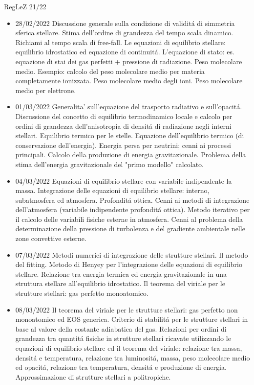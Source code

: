 \begin{frame}[allowframebreaks]{RegLeZ 21/22}
\begin{itemize}
\item 28/02/2022 Discussione generale sulla condizione di validit\'a di simmetria sferica stellare. Stima dell'ordine di grandezza del tempo scala dinamico. Richiami al tempo scala di free-fall. Le equazioni di equilibrio stellare: equilibrio idrostatico ed equazione di continuit\'a. L'equazione di stato: es. equazione di stai dei gas perfetti + pressione di radiazione. Peso molecolare medio. Esempio: calcolo del peso molecolare medio per materia completamente ionizzata. Peso molecolare medio degli ioni. Peso molecolare medio per elettrone.
\item 01/03/2022 Generalita' sull'equazione del trasporto radiativo e sull'opacit\'a. Discussione del concetto di equilibrio termodinamico locale e calcolo per ordini di grandezza dell'anisotropia di densit\'a di radiazione negli interni stellari. Equilibrio termico per le stelle. Equazione dell'equilibrio termico (di conservazione dell'energia). Energia persa per neutrini; cenni ai processi principali. Calcolo della produzione di energia gravitazionale. Problema della stima dell'energia gravitazionale del "primo modello" calcolato.
\item 04/03/2022 Equazioni di equilibrio stellare con variabile indipendente la massa. Integrazione delle equazioni di equilibrio stellare: interno, subatmosfera ed atmosfera. Profondit\'a ottica. Cenni ai metodi di integrazione dell'atmosfera (variabile indipendente profondit\'a ottica). Metodo iterativo per il calcolo delle variabili fisiche esterne in atmosfera. Cenni al problema della determinazione della pressione di turbolenza e del gradiente ambientale nelle zone convettive esterne.
\item 07/03/2022 Metodi numerici di integrazione delle strutture stellari. Il metodo del fitting. Metodo di Henyey per l'integrazione delle equazioni di equilibrio stellare. Relazione tra energia termica ed energia gravitazionale in una struttura stellare all'equilibrio idrostatico. Il teorema del viriale per le strutture stellari: gas perfetto monoatomico.
\item 08/03/2022 Il teorema del viriale per le strutture stellari: gas perfetto non monoatomico ed EOS generica. Criterio di stabilit\'a per le strutture stellari in base al valore della costante adiabatica del gas. Relazioni per ordini di grandezza tra quantit\'a fisiche in strutture stellari ricavate utilizzando le equazioni di equilibrio stellare ed il teorema del viriale: relazione tra massa, densit\'a e temperatura, relazione tra luminosit\'a, massa, peso molecolare medio ed opacit\'a, relazione tra temperatura, densit\'a e produzione di energia. Approssimazione di strutture stellari a politropiche.

\end{itemize}
\end{frame}
